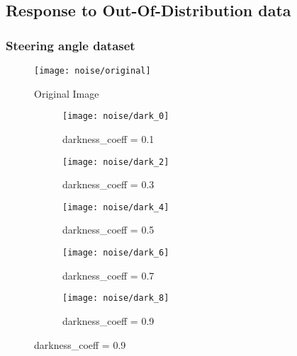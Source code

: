 \subsection {Response to Out-Of-Distribution data}\label{subsec_ood}
\subsubsection{Steering angle dataset}
\begin{figure}[H]
	\centering
	\texttt{[image: noise/original]}
	\caption{Original Image}
	\label{fig_original_noise}
	\hfill
\end{figure}
\begin{figure}[H]
	\centering
	\begin{subfigure}[b]{0.18\textwidth}
		\centering
		\texttt{[image: noise/dark\_0]}
		\caption{darkness\_coeff = 0.1}
		\label{mcdo_fn2}
	\end{subfigure}
	\hfill
	\begin{subfigure}[b]{0.18\textwidth}
		\centering
		\texttt{[image: noise/dark\_2]}
		\caption{darkness\_coeff = 0.3}
		\label{der_fn2}
	\end{subfigure}
	\hfill
	\begin{subfigure}[b]{0.18\textwidth}
		\centering
		\texttt{[image: noise/dark\_4]}
		\caption{darkness\_coeff = 0.5}
		\label{homo_fn3}
	\end{subfigure}
	\hfill
	\begin{subfigure}[b]{0.18\textwidth}
		\centering
		\texttt{[image: noise/dark\_6]}
		\caption{darkness\_coeff = 0.7}
		\label{hetero_fn3}
	\end{subfigure}
	\hfill
	\begin{subfigure}[b]{0.18\textwidth}
		\centering
		\texttt{[image: noise/dark\_8]}
		\caption{darkness\_coeff = 0.9}
		\label{mcdo_fn3}
	\end{subfigure}
	\hfill
	\label{fig_noise_dark}
\end{figure}
